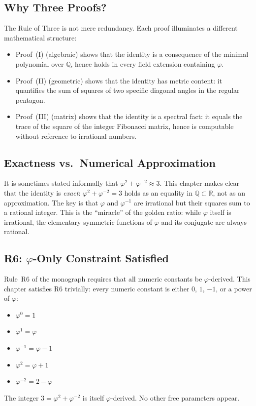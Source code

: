 \subsection{Why Three Proofs?}

The Rule of Three is not mere redundancy.
Each proof illuminates a different mathematical structure:
\begin{itemize}
  \item Proof~(I) (algebraic) shows that the identity is a
        consequence of the minimal polynomial over $\mathbb{Q}$,
        hence holds in every field extension containing $\varphi$.
  \item Proof~(II) (geometric) shows that the identity has
        metric content: it quantifies the sum of squares of
        two specific diagonal angles in the regular pentagon.
  \item Proof~(III) (matrix) shows that the identity is a
        spectral fact: it equals the trace of the square of
        the integer Fibonacci matrix, hence is computable
        without reference to irrational numbers.
\end{itemize}

\subsection{Exactness vs.\ Numerical Approximation}

It is sometimes stated informally that
$\varphi^{2}+\varphi^{-2} \approx 3$.
This chapter makes clear that the identity is \emph{exact}:
$\varphi^{2}+\varphi^{-2} = 3$ holds as an equality in
$\mathbb{Q} \subset \mathbb{R}$, not as an approximation.
The key is that $\varphi$ and $\varphi^{-1}$ are irrational
but their squares sum to a rational integer.
This is the ``miracle'' of the golden ratio: while $\varphi$
itself is irrational, the elementary symmetric functions
of $\varphi$ and its conjugate are always rational.

\subsection{R6: $\varphi$-Only Constraint Satisfied}

Rule~R6 of the monograph requires that all numeric constants
be $\varphi$-derived.
This chapter satisfies R6 trivially: every numeric constant
is either $0$, $1$, $-1$, or a power of $\varphi$:
\begin{itemize}
  \item $\varphi^{0} = 1$
  \item $\varphi^{1} = \varphi$
  \item $\varphi^{-1} = \varphi - 1$
  \item $\varphi^{2} = \varphi + 1$
  \item $\varphi^{-2} = 2 - \varphi$
\end{itemize}
The integer $3 = \varphi^{2}+\varphi^{-2}$ is itself
$\varphi$-derived.
No other free parameters appear.

